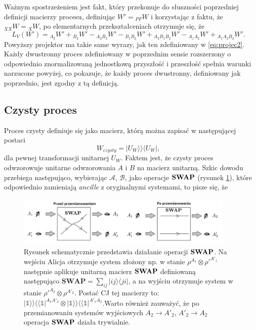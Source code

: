 \documentclass[10pt]{article} %
\newcommand{\Ket}[1]{|#1\rangle}
\newcommand{\Bra}[1]{\langle#1|}
\newcommand{\BBra}[1]{\langle\langle#1|}
\newcommand{\KKet}[1]{|#1\rangle\rangle}
\newcommand{\I}{\mathbb{1}}
\begin{document}
Ważnym spostrzeżeniem jest fakt, który przekonuje do słuszności poprzedniej definicji macierzy procesu, definiując $W' = {}_{PF}W$ i korzystając z faktu, że
${}_{XX}W = {}_{X}W$, po elementarnych przekształceniach otrzymuje się, że
\begin{equation}
L_V(W') = {}_{A_2}W' + {}_{B_2}W' - {}_{A_2B_2}W' - {}_{B_1B_2}W' + {}_{A_2B_1B_2}W' - {}_{A_1A_2}W' + {}_{A_1A_2B_2}W'.
\end{equation}
Powyższy projektor ma takie same wyrazy, jak ten zdefiniowany w \eqref{eq:projec2}.
Każdy dwustronny proces zdefiniowany w poprzednim sensie rozszerzony o odpowiednio znormalizowaną jednostkową przyszłość i przeszłość spełnia warunki narzucone powyżej, co pokazuje, że każdy proces dwustronny, definiowany jak poprzednio, jest zgodny z tą definicją.
\subsection{Czysty proces}
Proces czysty definiuje się jako macierz, którą można zapisać w następującej postaci
\begin{equation}
W_{czysty} = \KKet{U_W}\Bra{U_W},
\end{equation} dla pewnej transformacji unitarnej $U_W$. Faktem jest, że czysty proces odwzorowuje unitarne odwzorowania $A$ i $B$ na macierz unitarną. Szkic dowodu przebiega następująco,
wybierając $\mathcal{A}$, $\mathcal{B}$, jako operacje $\bf{SWAP}$ (rysunek \ref{swap}), które odpowiednio zamieniają \textit{ancille} z oryginalnymi systemami, to pisze się, że
\begin{figure}[t]
\centering
\includegraphics[width=0.95\textwidth]{obrazki/swap}
\caption{Rysunek schematycznie przedstawia działanie operacji $\bf{SWAP}$. Na wejściu Alicja otrzymuje system złożony np. w stanie $\rho^{A_1} \otimes \rho'^{A'_1}$ następnie aplikuje unitarną macierz $\bf{SWAP}$ definiowaną następująco $\textbf{SWAP} = \sum_{ij} \Ket{ij}\Bra{ji}$, a na wyjściu otrzymuje system w stanie $\rho'^{A_2} \otimes \rho^{A'_2}$. Postać CJ tej macierzy to: $\KKet{\I}\BBra{\I}^{A_1A'_2} \otimes \KKet{\I}\BBra{\I}^{A'_1A_2}$.Warto również zauważyć, że po przemianowaniu systemów wyjściowych $A_2 \to A'_2$, $A'_2 \to A_2$ operacja $\bf{SWAP}$ działa trywialnie.}
\label{swap}
\end{figure}
\end{document}
